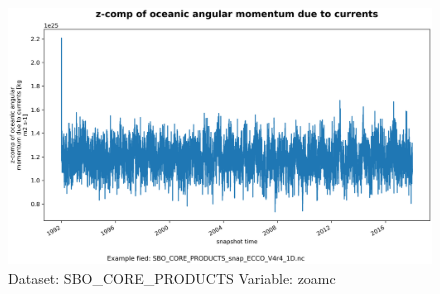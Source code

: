 \begin{figure}[H]
\centering
\includegraphics[scale=0.55]{../images/plots/oneD_plots/SBO_Core_Products/zoamc.png}
\caption{Dataset: SBO\_CORE\_PRODUCTS Variable: zoamc}
\label{tab:table-SBO_CORE_PRODUCTS_zoamc-Plot}
\end{figure}
\pagebreak
